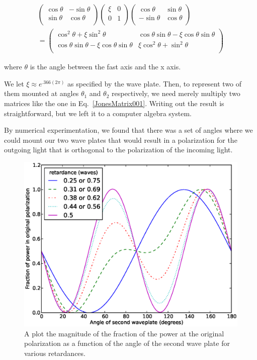 \begin{multline}
\begin{pmatrix}
\cos\theta & - \sin \theta \\
\sin \theta & \cos\theta \\
\end{pmatrix}
\begin{pmatrix}
\xi & 0 \\
0 & 1 \\
\end{pmatrix}
\begin{pmatrix}
\cos\theta &  \sin \theta \\
-\sin \theta & \cos\theta \\
\end{pmatrix} \\
=
\begin{pmatrix}
\cos ^2 \theta+\xi \sin^2 \theta &  \cos\theta \sin \theta-\xi \cos\theta \sin \theta \\
\cos\theta \sin \theta-\xi \cos \theta \sin\theta & \xi \cos^2 \theta + \sin^2 \theta \\ \label{JonesMatrix001}
\end{pmatrix}
\end{multline}

where $\theta$ is the angle between the fast axis and the x axis. 

We let $\xi\approx e^{.366 (2 \pi)}$ as specified by the wave plate. Then, to represent two of them mounted at angles $\theta_1$ and $\theta_2$ respectively, we need merely multiply two matrices like the one in Eq.\ \ref{JonesMatrix001}. Writing out the result is straightforward, but we left it to a computer algebra system.

By numerical experimentation, we found that there was a set of angles where we could mount our two wave plates that would result in a polarization for the outgoing light that is orthogonal to the polarization of the incoming light. 

\begin{figure}
    \centerline{\includegraphics[width=.9\textwidth]{NewNotesSymmetricFig}}
    \caption[Transmitted power vs angle]{\label{fig:numericalLightControlMethod}
    A plot the magnitude of the fraction of the power at the original polarization as a function of the angle of the second wave plate for various retardances.}
\end{figure}


